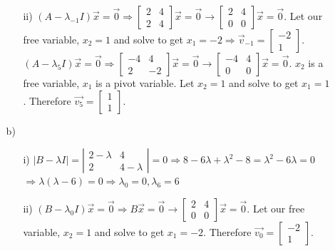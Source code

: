 \documentclass[12pt,pdftex]{article}
\begin{document}
\begin{itemize}
\begin{itemize}
\begin{itemize}
             \item[ii)] $(A-\lambda_{-1}I)\vec{x}=\vec{0} \Rightarrow 
             			 \begin{bmatrix}2 & 4 \\ 2 & 4 \end{bmatrix}\vec{x}=\vec{0} \longrightarrow 
                         \begin{bmatrix}2 & 4 \\ 0 & 0 \end{bmatrix}\vec{x}=\vec{0}$.  
                         Let our free variable, $x_2=1$ 
                         and solve to get $x_1=-2 \Rightarrow \vec{v}_{-1}=\begin{bmatrix}-2 \\ 1 \end{bmatrix}$. \\
                         $(A-\lambda_{5}I)\vec{x}=\vec{0} \Rightarrow 
                         \begin{bmatrix}-4 & 4 \\ 2 & -2 \end{bmatrix}\vec{x}=\vec{0}
                         \longrightarrow \begin{bmatrix}-4 & 4 \\ 0 & 0 \end{bmatrix}\vec{x}=\vec{0}$. 
                         $x_2$ is a free variable, $x_1$ is a pivot variable. Let $x_2=1$ and solve to get $x_1=1$.
                         Therefore $\vec{v_5}=\begin{bmatrix}1 \\ 1\end{bmatrix}$.
             
	      \end{itemize}
\item[b)] \begin{itemize}
		     \item[i)] $|B-\lambda I|=\left|\begin{matrix}
		     			2-\lambda & 4 \\ 2 & 4-\lambda
		     		    \end{matrix}\right|=0 \Rightarrow 8-6\lambda+\lambda^2-8=\lambda^2-6\lambda=0$ \\$
                        \Rightarrow \lambda(\lambda-6)=0 \Rightarrow \lambda_0=0, \lambda_6=6$
             \item[ii)] $(B-\lambda_0I)\vec{x}=\vec{0} \Rightarrow 
             			B\vec{x}=\vec{0} \longrightarrow \begin{bmatrix}
             			2 & 4 \\ 0 & 0
             			\end{bmatrix}\vec{x}=\vec{0}$. Let our free variable, $x_2=1$ and solve to get $x_1=-2$.
                        Therefore $\vec{v_0}=\begin{bmatrix}-2 \\ 1\end{bmatrix}$. \\
                        

\end{itemize}
\end{itemize}
\end{itemize}
\end{document}
